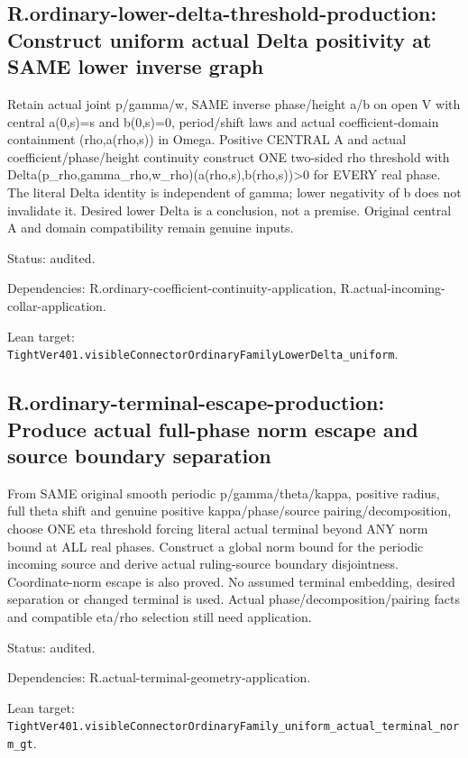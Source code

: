 \documentclass{article}
\begin{document}
\subsection*{R.ordinary-lower-delta-threshold-production: Construct uniform actual Delta positivity at SAME lower inverse graph}
Retain actual joint p/gamma/w, SAME inverse phase/height a/b on open V with central a(0,s)=s and b(0,s)=0, period/shift laws and actual coefficient-domain containment (rho,a(rho,s)) in Omega. Positive CENTRAL A and actual coefficient/phase/height continuity construct ONE two-sided rho threshold with Delta(p\_rho,gamma\_rho,w\_rho)(a(rho,s),b(rho,s))>0 for EVERY real phase. The literal Delta identity is independent of gamma; lower negativity of b does not invalidate it. Desired lower Delta is a conclusion, not a premise. Original central A and domain compatibility remain genuine inputs.
\par Status: audited.
\par Dependencies: R.ordinary-coefficient-continuity-application, R.actual-incoming-collar-application.
\par Lean target: \texttt{TightVer401.visibleConnectorOrdinaryFamilyLowerDelta\_uniform}.
\subsection*{R.ordinary-terminal-escape-production: Produce actual full-phase norm escape and source boundary separation}
From SAME original smooth periodic p/gamma/theta/kappa, positive radius, full theta shift and genuine positive kappa/phase/source pairing/decomposition, choose ONE eta threshold forcing literal actual terminal beyond ANY norm bound at ALL real phases. Construct a global norm bound for the periodic incoming source and derive actual ruling-source boundary disjointness. Coordinate-norm escape is also proved. No assumed terminal embedding, desired separation or changed terminal is used. Actual phase/decomposition/pairing facts and compatible eta/rho selection still need application.
\par Status: audited.
\par Dependencies: R.actual-terminal-geometry-application.
\par Lean target: \texttt{TightVer401.visibleConnectorOrdinaryFamily\_uniform\_actual\_terminal\_norm\_gt}.
\end{document}
